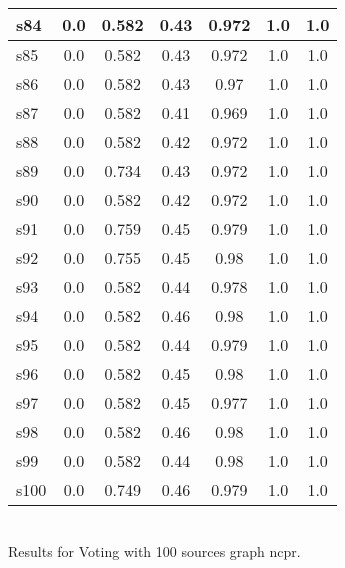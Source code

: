 \documentclass{article}
\begin{document}
\begin{tabular}{|l|c|c|c|c|c|c|}
\hline
s84 &0.0 & 0.582 & 0.43 & 0.972 & 1.0 & 1.0\\
\hline
s85 &0.0 & 0.582 & 0.43 & 0.972 & 1.0 & 1.0\\
\hline
s86 &0.0 & 0.582 & 0.43 & 0.97 & 1.0 & 1.0\\
\hline
s87 &0.0 & 0.582 & 0.41 & 0.969 & 1.0 & 1.0\\
\hline
s88 &0.0 & 0.582 & 0.42 & 0.972 & 1.0 & 1.0\\
\hline
s89 &0.0 & 0.734 & 0.43 & 0.972 & 1.0 & 1.0\\
\hline
s90 &0.0 & 0.582 & 0.42 & 0.972 & 1.0 & 1.0\\
\hline
s91 &0.0 & 0.759 & 0.45 & 0.979 & 1.0 & 1.0\\
\hline
s92 &0.0 & 0.755 & 0.45 & 0.98 & 1.0 & 1.0\\
\hline
s93 &0.0 & 0.582 & 0.44 & 0.978 & 1.0 & 1.0\\
\hline
s94 &0.0 & 0.582 & 0.46 & 0.98 & 1.0 & 1.0\\
\hline
s95 &0.0 & 0.582 & 0.44 & 0.979 & 1.0 & 1.0\\
\hline
s96 &0.0 & 0.582 & 0.45 & 0.98 & 1.0 & 1.0\\
\hline
s97 &0.0 & 0.582 & 0.45 & 0.977 & 1.0 & 1.0\\
\hline
s98 &0.0 & 0.582 & 0.46 & 0.98 & 1.0 & 1.0\\
\hline
s99 &0.0 & 0.582 & 0.44 & 0.98 & 1.0 & 1.0\\
\hline
s100 &0.0 & 0.749 & 0.46 & 0.979 & 1.0 & 1.0\\
\hline
\end{tabular}\\

\noindent Results for Voting with 100 sources graph ncpr.
\end{document}
